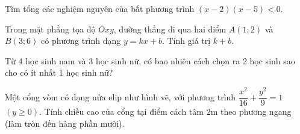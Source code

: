 
\NQuestion Tìm tổng các nghiệm nguyên của bất phương trình $(x-2)(x-5)<0$.

\NQuestion Trong mặt phẳng tọa độ $Oxy$, đường thẳng đi qua hai điểm $A(1;2)$ và $B(3;6)$ có phương trình dạng $y=kx+b$. Tính giá trị $k+b$.

\NQuestion Từ 4 học sinh nam và 3 học sinh nữ, có bao nhiêu cách chọn ra 2 học sinh sao cho có ít nhất 1 học sinh nữ?

\NQuestion Một cổng vòm có dạng nửa elip như hình vẽ, với phương trình $\dfrac{x^2}{16}+\dfrac{y^2}{9}=1$ $(y\ge 0)$. Tính chiều cao của cổng tại điểm cách tâm $2$m theo phương ngang (làm tròn đến hàng phần mười).

\begin{center}

\end{center}
